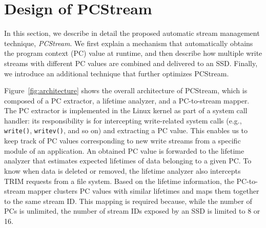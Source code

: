 \section{Design of PCStream}
In this section, we describe in detail the proposed automatic stream management
technique, \textit{PCStream}.  We first explain a mechanism that automatically
obtains the program context (PC) value at runtime, and then describe how
multiple write streams with different PC values are combined and delivered to
an SSD. Finally, we introduce an additional technique that further optimizes
PCStream.


Figure~\ref{fig:architecture} shows the overall architecture of PCStream, which
is composed of a PC extractor, a lifetime analyzer, and a PC-to-stream mapper.
The PC extractor is implemented in the Linux kernel as part of a system call
handler: its responsibility is for intercepting write-related system calls
(e.g., \texttt{write()}, \texttt{writev()}, and so on) and extracting a PC
value.  This enables us to keep track of PC values corresponding to new write
streams from a specific module of an application. An obtained PC value is
forwarded to the lifetime analyzer that estimates expected lifetimes of data
belonging to a given PC. To know when data is deleted or removed, the lifetime
analyzer also intercepts TRIM requests from a file system.  Based on the
lifetime information, the PC-to-stream mapper clusters PC values with similar
lifetimes and maps them together to the same stream ID.  This mapping is
required because, while the number of PCs is unlimited, the number of stream
IDs exposed by an SSD is limited to 8 or 16.


